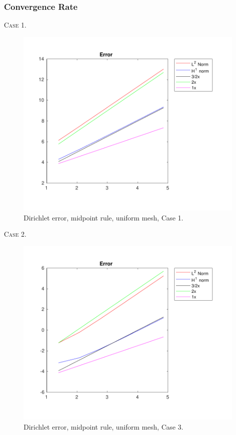 \documentclass[a4paper]{article}
\numberwithin{equation}{section}
\begin{document}
\newpage
\subsubsection{Convergence Rate}
\textsc{Case 1.}
\begin{figure}[H]
\centering\includegraphics[width=13.5cm]{fig_dirichlet_error_midpoint_cp_uniform_midpoint_C1_M6}
\caption{Dirichlet error, midpoint rule, uniform mesh, Case 1.}
\end{figure}
\newpage
\noindent
\textsc{Case 2.}
\begin{figure}[H]
\centering\includegraphics[width=13.5cm]{fig_dirichlet_error_midpoint_cp_uniform_midpoint_C2_M6}
\caption{Dirichlet error, midpoint rule, uniform mesh, Case 3.}
\end{figure}
\end{document}
